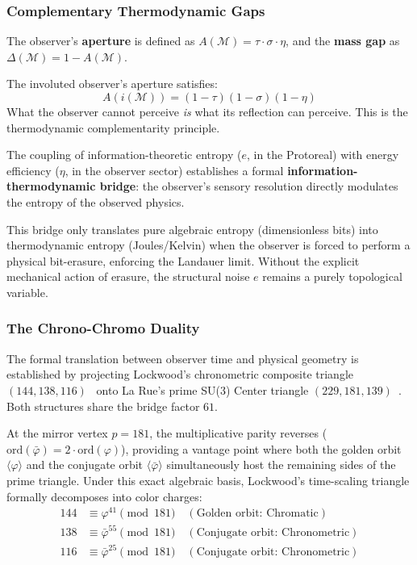 \subsubsection{Complementary Thermodynamic Gaps}

The observer's \textbf{aperture} is defined as $A(\mathcal{M}) = \tau \cdot \sigma \cdot \eta$, and the \textbf{mass gap} as $\Delta(\mathcal{M}) = 1 - A(\mathcal{M})$.

\begin{theorem}
The involuted observer's aperture satisfies:
\begin{equation}
    A(i(\mathcal{M})) = (1 - \tau)(1 - \sigma)(1 - \eta)
\end{equation}
What the observer cannot perceive \emph{is} what its reflection can perceive. This is the thermodynamic complementarity principle.
\end{theorem}

The coupling of information-theoretic entropy ($e$, in the Protoreal) with energy efficiency ($\eta$, in the observer sector) establishes a formal \textbf{information-thermodynamic bridge}: the observer's sensory resolution directly modulates the entropy of the observed physics. 

\begin{theorem}
This bridge only translates pure algebraic entropy (dimensionless bits) into thermodynamic entropy (Joules/Kelvin) when the observer is forced to perform a physical bit-erasure, enforcing the Landauer limit. Without the explicit mechanical action of erasure, the structural noise $e$ remains a purely topological variable.
\end{theorem}

\subsubsection{The Chrono-Chromo Duality}

The formal translation between observer time and physical geometry is established by projecting Lockwood's chronometric composite triangle $(144, 138, 116)$~\cite{lockwood_chrono} onto La Rue's prime SU(3) Center triangle $(229, 181, 139)$~\cite{larue_chromatic}. Both structures share the bridge factor $61$. 

At the mirror vertex $p = 181$, the multiplicative parity reverses ($\mathrm{ord}(\bar{\varphi}) = 2 \cdot \mathrm{ord}(\varphi)$), providing a vantage point where both the golden orbit $\langle \varphi \rangle$ and the conjugate orbit $\langle \bar{\varphi} \rangle$ simultaneously host the remaining sides of the prime triangle. Under this exact algebraic basis, Lockwood's time-scaling triangle formally decomposes into color charges:
\begin{align*}
144 &\equiv \varphi^{41} \pmod{181} \quad (\text{Golden orbit: Chromatic}) \\
138 &\equiv \bar{\varphi}^{55} \pmod{181} \quad (\text{Conjugate orbit: Chronometric}) \\
116 &\equiv \bar{\varphi}^{25} \pmod{181} \quad (\text{Conjugate orbit: Chronometric})
\end{align*}

